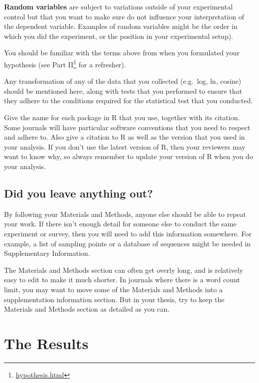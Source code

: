 \documentclass[
]{krantz}
\renewcommand{\href}[2]{#2\footnote{\url{#1}}}
\begin{document}
\textbf{Random variables} are subject to variations outside of your experimental control but that you want to make sure do not influence your interpretation of the dependent variable. Examples of random variables might be the order in which you did the experiment, or the position in your experimental setup).

You should be familiar with the terms above from when you formulated your hypothesis (see \href{hypothesis.html}{Part II} for a refresher).

Any transformation of any of the data that you collected (e.g.~log, ln, cosine) should be mentioned here, along with tests that you performed to ensure that they adhere to the conditions required for the statistical test that you conducted.

Give the name for each package in R that you use, together with its citation. Some journals will have particular software conventions that you need to respect and adhere to. Also give a citation to R as well as the version that you used in your analysis. If you don't use the latest version of R, then your reviewers may want to know why, so always remember to update your version of R when you do your analysis.

\hypertarget{did-you-leave-anything-out}{%
\subsection{Did you leave anything out?}\label{did-you-leave-anything-out}}

By following your Materials and Methods, anyone else should be able to repeat your work. If there isn't enough detail for someone else to conduct the same experiment or survey, then you will need to add this information somewhere. For example, a list of sampling points or a database of sequences might be needed in Supplementary Information.

The Materials and Methods section can often get overly long, and is relatively easy to edit to make it much shorter. In journals where there is a word count limit, you may want to move some of the Materials and Methods into a supplementation information section. But in your thesis, try to keep the Materials and Methods section as detailed as you can.

\hypertarget{results}{%
\section{The Results}\label{results}}
\end{document}
